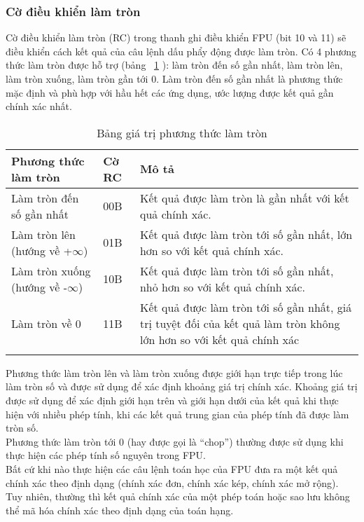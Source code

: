 		\subsubsection*{Cờ điều khiển làm tròn}
		Cờ điều khiển làm tròn (RC) trong thanh ghi điều khiển FPU (bit 10 và 11) sẽ điều khiển cách kết quả của câu lệnh dấu phẩy động được làm tròn. Có 4 phương thức làm tròn được hỗ trợ (bảng ~\ref{tb:LamTron} ): làm tròn đến số gần nhất, làm tròn lên, làm tròn xuống, làm tròn gần tới 0. Làm tròn đến số gần nhất là phương thức mặc định và phù hợp với hầu hết các ứng dụng, ước lượng được kết quả gần chính xác nhất.
		\begin{longtable}{|m{6cm}|m{2cm}|m{7cm}|}
		\hline
			Phương thức làm tròn & Cờ RC & Mô tả\\
		\hline
		\hline
			Làm tròn đến số gần nhất & 00B & Kết quả được làm tròn là gần nhất với kết quả chính xác.\\
		\hline
			Làm tròn lên (hướng về +$\mathbf{\infty}$) &01B& Kết quả được làm tròn tới số gần nhất, lớn hơn so với kết quả chính xác. \\
		\hline
			Làm tròn xuống (hướng về -$\mathbf{\infty}$) & 10B &Kết quả được làm tròn tới số gần nhất,  nhỏ hơn so với kết quả chính xác. \\
		\hline
			Làm tròn về 0 & 11B & Kết quả được làm tròn tới số gần nhất,  giá trị tuyệt đối của kết quả làm tròn không lớn hơn so với kết quả chính xác\\
		\hline
			\caption{Bảng giá trị  phương thức làm tròn}
			\label{tb:LamTron}
		\end{longtable}
	
		Phương thức làm tròn lên và làm tròn xuống được giới hạn trực tiếp trong lúc làm tròn số và được sử dụng để xác định khoảng giá trị chính xác. Khoảng giá trị được sử dụng để xác định giới hạn trên và giới hạn dưới của kết quả khi thực hiện với nhiều phép tính, khi các kết quả trung gian của phép tính đã được làm tròn số.\\ 
		
	Phương thức làm tròn tới 0 (hay được gọi là “chop”) thường được sử dụng khi thực hiện các phép tính số nguyên trong FPU. \\
	
	Bất cứ khi nào thực hiện các câu lệnh toán học của FPU đưa ra một kết quả chính xác theo định dạng (chính xác đơn, chính xác kép, chính xác mở rộng). Tuy nhiên, thường thì kết quả chính xác của một phép toán hoặc sao lưu không thể mã hóa chính xác theo định dạng của toán hạng.\\
	
